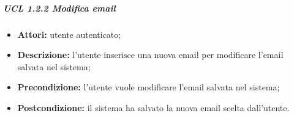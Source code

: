 \iffalse %
\subparagraph{UCL 1.2.2.3 Modifica nome}
\begin{itemize}
	\item \textbf{Attori: } utente autenticato.
	\item \textbf{Descrizione: } l'utente inserisce il nuovo nome, il sistema procede con il salvataggio delle modifiche
	\item \textbf{Precondizione: } l'utente vuole modicare il suo nome salvato nel sistema.
	\item \textbf{Postcondizione:} la modifica del nome viene salvato dal sistema.
\end{itemize}

\subparagraph{UCL 1.2.2.4  Modifica cognome}
\begin{itemize}
	\item \textbf{Attori: }  utente autenticato.
	\item \textbf{Descrizione: } l'utente inserisce il nuovo cognome, il sistema procede con il salvataggio del dato.
	\item \textbf{Precondizione: } l'utente vuole cambiare il suo cognome salvato nel sistema.
	\item \textbf{Postcondizione:} il nuovo cognome viene salvato dal sistema.
\end{itemize}
\fi

\iffalse
\subparagraph{UCL 1.2.2  Modifica numero di telefono}
\begin{itemize}
\item \textbf{Attori: } utente autenticato;
\item \textbf{Descrizione: } l'utente inserisce il nuovo numero di telefono e il sistema procede con la modifica;
\item \textbf{Precondizione: } l'utente vuole modificare il numero di telefono salvato;
\item \textbf{Postcondizione:} il sistema ha salvato il nuovo di numero di telefono scelto dall'utente.
\end{itemize}
\fi

\subparagraph{UCL 1.2.2  Modifica email}
\begin{itemize}
\item \textbf{Attori:} utente autenticato;
\item \textbf{Descrizione:} l'utente inserisce una nuova email per modificare l'email salvata nel sistema;
\item \textbf{Precondizione:} l'utente vuole modificare l'email salvata nel sistema;
\item \textbf{Postcondizione:} il sistema ha salvato la nuova email scelta dall'utente.
\end{itemize}

